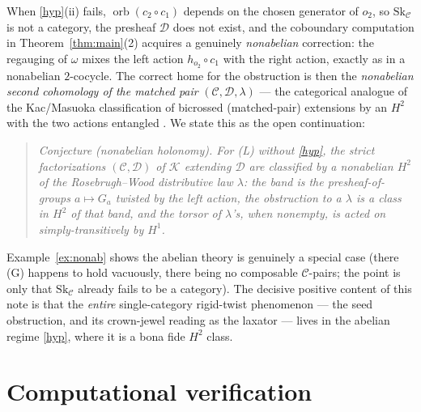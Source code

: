 \documentclass[11pt]{article}
\theoremstyle{definition}
\newcommand{\C}{\mathcal{C}}
\newcommand{\D}{\mathcal{D}}
\newcommand{\K}{\mathcal{K}}
\newcommand{\Sk}{\mathrm{Sk}}
\newcommand{\orb}{\operatorname{orb}}
\newcommand{\1}{\mathbf{1}}
\begin{document}
When \ref{hyp}(ii) fails, $\orb(c_2\circ c_1)$ depends on the chosen generator of
$o_2$, so $\Sk_\C$ is not a category, the presheaf $\D$ does not exist, and the
coboundary computation in Theorem~\ref{thm:main}(2) acquires a genuinely
\emph{nonabelian} correction: the regauging of $\omega$ mixes the left action
$h_{o_2}\circ c_1$ with the right action, exactly as in a nonabelian $2$-cocycle.
The correct home for the obstruction is then the \emph{nonabelian second
cohomology of the matched pair} $(\C,\D,\lambda)$ --- the categorical analogue of
the Kac/Masuoka classification of bicrossed (matched-pair) extensions by an $H^2$
with the two actions entangled \cite{kac,masuoka}. We state this as the open
continuation:

\begin{quote}\itshape
Conjecture (nonabelian holonomy). For \textnormal{(L)} without \ref{hyp}, the
strict factorizations $(\C,\D)$ of $\K$ extending $\D$ are classified by a
nonabelian $H^2$ of the Rosebrugh--Wood distributive law $\lambda$: the band is the
presheaf-of-groups $a\mapsto G_a$ twisted by the left action, the obstruction to a
$\lambda$ is a class in $H^2$ of that band, and the torsor of $\lambda$'s, when
nonempty, is acted on simply-transitively by $H^1$.
\end{quote}

Example~\ref{ex:nonab} shows the abelian theory is genuinely a special case (there
\textnormal{(G)} happens to hold vacuously, there being no composable $\C$-pairs;
the point is only that $\Sk_\C$ already fails to be a category). The decisive
positive content of this note is that the \emph{entire} single-category rigid-twist
phenomenon --- the seed obstruction, and its crown-jewel reading as the laxator ---
lives in the abelian regime \ref{hyp}, where it is a bona fide $H^2$ class.

\section{Computational verification}\label{sec:comp}
\end{document}
